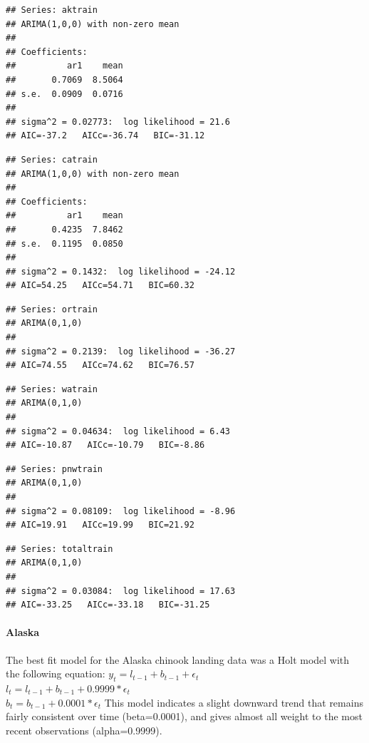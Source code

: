 \documentclass[
]{article}
\begin{document}
\begin{verbatim}
## Series: aktrain 
## ARIMA(1,0,0) with non-zero mean 
## 
## Coefficients:
##          ar1    mean
##       0.7069  8.5064
## s.e.  0.0909  0.0716
## 
## sigma^2 = 0.02773:  log likelihood = 21.6
## AIC=-37.2   AICc=-36.74   BIC=-31.12
\end{verbatim}

\begin{verbatim}
## Series: catrain 
## ARIMA(1,0,0) with non-zero mean 
## 
## Coefficients:
##          ar1    mean
##       0.4235  7.8462
## s.e.  0.1195  0.0850
## 
## sigma^2 = 0.1432:  log likelihood = -24.12
## AIC=54.25   AICc=54.71   BIC=60.32
\end{verbatim}

\begin{verbatim}
## Series: ortrain 
## ARIMA(0,1,0) 
## 
## sigma^2 = 0.2139:  log likelihood = -36.27
## AIC=74.55   AICc=74.62   BIC=76.57
\end{verbatim}

\begin{verbatim}
## Series: watrain 
## ARIMA(0,1,0) 
## 
## sigma^2 = 0.04634:  log likelihood = 6.43
## AIC=-10.87   AICc=-10.79   BIC=-8.86
\end{verbatim}

\begin{verbatim}
## Series: pnwtrain 
## ARIMA(0,1,0) 
## 
## sigma^2 = 0.08109:  log likelihood = -8.96
## AIC=19.91   AICc=19.99   BIC=21.92
\end{verbatim}

\begin{verbatim}
## Series: totaltrain 
## ARIMA(0,1,0) 
## 
## sigma^2 = 0.03084:  log likelihood = 17.63
## AIC=-33.25   AICc=-33.18   BIC=-31.25
\end{verbatim}

\paragraph{Alaska}\label{alaska}

The best fit model for the Alaska chinook landing data was a Holt model
with the following equation: \(y_t=l_{t-1}+b_{t-1}+\epsilon_t\)\\
\(l_t=l_{t-1}+b_{t-1}+0.9999*\epsilon_t\)\\
\(b_t =b_{t-1} + 0.0001*\epsilon_t\) This model indicates a slight
downward trend that remains fairly consistent over time (beta=0.0001),
and gives almost all weight to the most recent observations
(alpha=0.9999).
\end{document}
